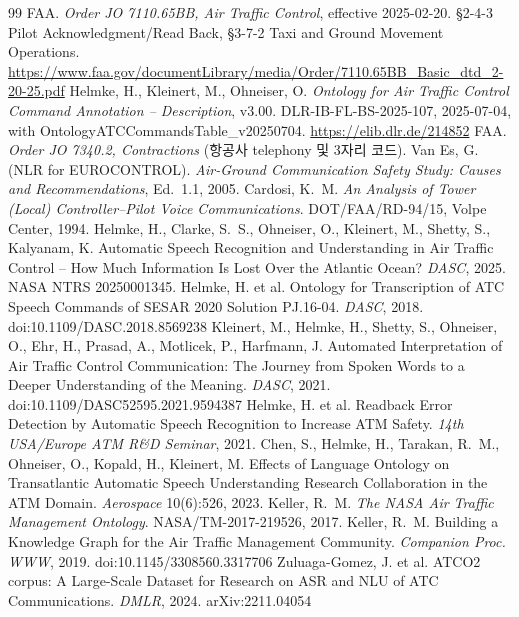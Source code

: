 \documentclass[10pt,a4paper]{article}
\begin{document}
\begin{thebibliography}{99}\small
{} FAA. \emph{Order JO 7110.65BB, Air Traffic Control}, effective 2025-02-20. §2-4-3 Pilot Acknowledgment/Read Back, §3-7-2 Taxi and Ground Movement Operations. \url{https://www.faa.gov/documentLibrary/media/Order/7110.65BB_Basic_dtd_2-20-25.pdf}
 Helmke, H., Kleinert, M., Ohneiser, O. \emph{Ontology for Air Traffic Control Command Annotation -- Description}, v3.00. DLR-IB-FL-BS-2025-107, 2025-07-04, with OntologyATCCommandsTable\_v20250704. \url{https://elib.dlr.de/214852}
 FAA. \emph{Order JO 7340.2, Contractions} (항공사 telephony 및 3자리 코드).
 Van Es, G. (NLR for EUROCONTROL). \emph{Air-Ground Communication Safety Study: Causes and Recommendations}, Ed.~1.1, 2005.
 Cardosi, K.~M. \emph{An Analysis of Tower (Local) Controller--Pilot Voice Communications}. DOT/FAA/RD-94/15, Volpe Center, 1994.
 Helmke, H., Clarke, S.~S., Ohneiser, O., Kleinert, M., Shetty, S., Kalyanam, K. Automatic Speech Recognition and Understanding in Air Traffic Control -- How Much Information Is Lost Over the Atlantic Ocean? \emph{DASC}, 2025. NASA NTRS 20250001345.
 Helmke, H. et al. Ontology for Transcription of ATC Speech Commands of SESAR 2020 Solution PJ.16-04. \emph{DASC}, 2018. doi:10.1109/DASC.2018.8569238
 Kleinert, M., Helmke, H., Shetty, S., Ohneiser, O., Ehr, H., Prasad, A., Motlicek, P., Harfmann, J. Automated Interpretation of Air Traffic Control Communication: The Journey from Spoken Words to a Deeper Understanding of the Meaning. \emph{DASC}, 2021. doi:10.1109/DASC52595.2021.9594387
 Helmke, H. et al. Readback Error Detection by Automatic Speech Recognition to Increase ATM Safety. \emph{14th USA/Europe ATM R\&D Seminar}, 2021.
 Chen, S., Helmke, H., Tarakan, R.~M., Ohneiser, O., Kopald, H., Kleinert, M. Effects of Language Ontology on Transatlantic Automatic Speech Understanding Research Collaboration in the ATM Domain. \emph{Aerospace} 10(6):526, 2023.
 Keller, R.~M. \emph{The NASA Air Traffic Management Ontology}. NASA/TM-2017-219526, 2017.
 Keller, R.~M. Building a Knowledge Graph for the Air Traffic Management Community. \emph{Companion Proc. WWW}, 2019. doi:10.1145/3308560.3317706
 Zuluaga-Gomez, J. et al. ATCO2 corpus: A Large-Scale Dataset for Research on ASR and NLU of ATC Communications. \emph{DMLR}, 2024. arXiv:2211.04054

\end{thebibliography}
\end{document}
